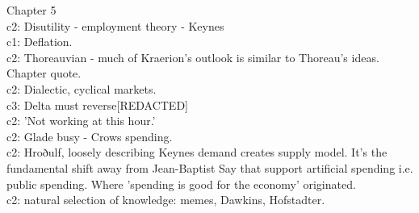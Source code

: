 Chapter 5\\[0.1cm]
c2: Disutility - employment theory - Keynes\\
c1: Deflation.\\
c2: Thoreauvian - much of Kraerion's outlook is similar to Thoreau's ideas. Chapter quote.\\
c2: Dialectic, cyclical markets.\\
c3: Delta must reverse[REDACTED]\\
c2: 'Not working at this hour.'\\
c2: Glade busy - Crows spending.\\
c2: Hroðulf, loosely describing Keynes demand creates supply model. It's the fundamental shift away from Jean-Baptist Say that support artificial spending i.e. public spending. Where 'spending is good for the economy' originated.\\
c2: natural selection of knowledge: memes, Dawkins, Hofstadter.\\

